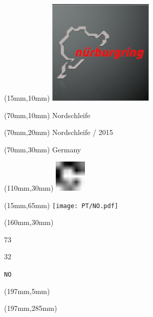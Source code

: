 \null\newpage
\begin{textblock*}{50mm}(15mm,10mm)%
\includegraphics[width=50mm]{LG/2015-05-20_00088.png}
\end{textblock*}
\begin{textblock*}{130mm}(70mm,10mm)%
{\fontsize{20}{20}\selectfont Nordschleife}\\
\end{textblock*}
\begin{textblock*}{120mm}(70mm,20mm)%
{\fontsize{16}{16}\selectfont Nordschleife / 2015}\\
\end{textblock*}
\begin{textblock*}{120mm}(70mm,30mm)%
{\fontsize{12}{12}\selectfont Germany}
\end{textblock*}
\begin{textblock*}{30mm}(110mm,30mm)%
\centering
\includegraphics[height=15mm]{icons/fa-rotate-right.pdf}
\end{textblock*}
\begin{textblock*}{185mm}(15mm,65mm)%
\centering
\mbox{\texttt{[image: PT/NO.pdf]}}
\end{textblock*}
\begin{textblock*}{40mm}(160mm,30mm)%
\Large
\par{} 
\par73 
\par32 
\par\hfill\tiny\tt NO\\
\end{textblock*}
\begin{textblock*}{20mm}(197mm,5mm)%
\fbox{\thepage}
\label{NO}
\end{textblock*}
\begin{textblock*}{20mm}(197mm,285mm)%
\fbox{\thepage}
\end{textblock*}

